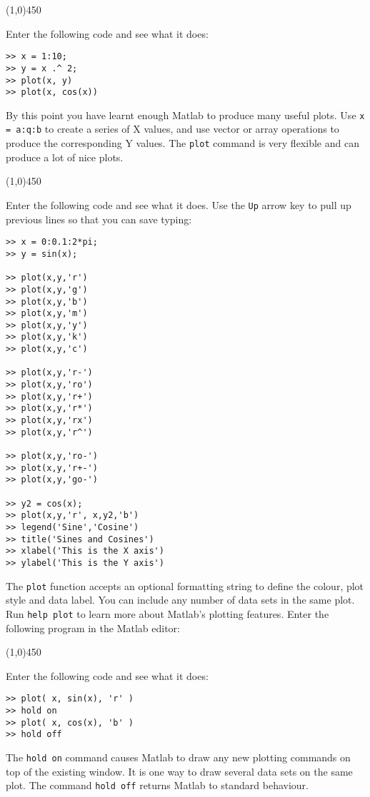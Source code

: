 \documentclass[12pt,a4paper]{article}   %
\newcommand{\code}[1]{\texttt{#1}}
\newcommand{\ruler}{
  \begin{center}
    \line(1,0){450}
  \end{center}
}
\begin{document}
\ruler

Enter the following code and see what it does:

\begin{verbatim}
>> x = 1:10;
>> y = x .^ 2;
>> plot(x, y)
>> plot(x, cos(x))
\end{verbatim}

By this point you have learnt enough Matlab to produce many useful plots. Use
\code{x = a:q:b} to create a series of X values, and use vector or array operations
to produce the corresponding Y values. The \code{plot} command is very flexible
and can produce a lot of nice plots.

\ruler

Enter the following code and see what it does. Use the \code{Up} arrow key to pull
up previous lines so that you can save typing:


\begin{verbatim}
>> x = 0:0.1:2*pi;
>> y = sin(x);

>> plot(x,y,'r')
>> plot(x,y,'g')
>> plot(x,y,'b')
>> plot(x,y,'m')
>> plot(x,y,'y')
>> plot(x,y,'k')
>> plot(x,y,'c')

>> plot(x,y,'r-')
>> plot(x,y,'ro')
>> plot(x,y,'r+')
>> plot(x,y,'r*')
>> plot(x,y,'rx')
>> plot(x,y,'r^')

>> plot(x,y,'ro-')
>> plot(x,y,'r+-')
>> plot(x,y,'go-')

>> y2 = cos(x);
>> plot(x,y,'r', x,y2,'b')
>> legend('Sine','Cosine')
>> title('Sines and Cosines')
>> xlabel('This is the X axis')
>> ylabel('This is the Y axis')
\end{verbatim}

The \code{plot} function accepts an optional formatting string to define the colour, plot
style and data label. You can include any number of data sets in the same plot. Run
\code{help plot} to learn more about Matlab's plotting features. Enter the following
program in the Matlab editor:


\ruler

Enter the following code and see what it does:

\begin{verbatim}
>> plot( x, sin(x), 'r' )
>> hold on
>> plot( x, cos(x), 'b' )
>> hold off
\end{verbatim}

The \code{hold on} command causes Matlab to draw any new plotting commands on top of the
existing window. It is one way to draw several data sets on the same plot. The command
\code{hold off} returns Matlab to standard behaviour.
\end{document}

